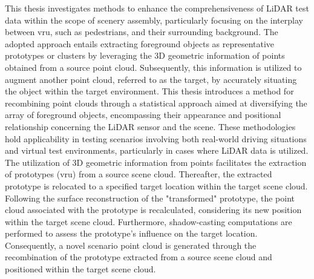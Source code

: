 This thesis investigates methods to enhance the comprehensiveness of LiDAR test data within the scope of scenery assembly, particularly focusing on the interplay between \acrfull{vru}, such as pedestrians, and their surrounding background. The adopted approach entails extracting foreground objects as representative prototypes or clusters by leveraging the 3D geometric information of points obtained from a source point cloud. Subsequently, this information is utilized to augment another point cloud, referred to as the target, by accurately situating the object within the target environment. This thesis introduces a method for recombining point clouds through a statistical approach aimed at diversifying the array of foreground objects, encompassing their appearance and positional relationship concerning the LiDAR sensor and the scene. These methodologies hold applicability in testing scenarios involving both real-world driving situations and virtual test environments, particularly in cases where LiDAR data is utilized. The utilization of 3D geometric information from points facilitates the extraction of prototypes (\acrshort{vru}) from a source scene cloud. Thereafter, the extracted prototype is relocated to a specified target location within the target scene cloud. Following the surface reconstruction of the "transformed" prototype, the point cloud associated with the prototype is recalculated, considering its new position within the target scene cloud. Furthermore, shadow-casting computations are performed to assess the prototype's influence on the target location. Consequently, a novel scenario point cloud is generated through the recombination of the prototype extracted from a source scene cloud and positioned within the target scene cloud.
